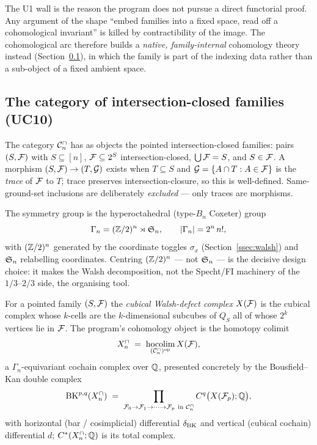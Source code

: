 \begin{remark}
\label{rem:u1-lesson}
The U1 wall is the reason the program does not pursue a direct
functorial proof. Any argument of the shape ``embed families into a
fixed space, read off a cohomological invariant'' is killed by
contractibility of the image. The cohomological arc therefore builds a
\emph{native, family-internal} cohomology theory instead
(Section~\ref{ssec:cn-category}), in which the family is part of the
indexing data rather than a sub-object of a fixed ambient space.
\end{remark}

\subsection{The category of intersection-closed families (UC10)}
\label{ssec:cn-category}

\begin{definition}
\label{def:cn-category}
The category $\mathcal{C}^{\cap}_n$ has as objects the pointed intersection-closed
families: pairs $(S,\mathcal{F})$ with $S\subseteq[n]$, $\mathcal{F}\subseteq2^S$
intersection-closed, $\bigcup\mathcal{F}=S$, and $S\in\mathcal{F}$. A morphism
$(S,\mathcal{F})\to(T,\mathcal{G})$ exists when $T\subseteq S$ and $\mathcal{G}=\{A\cap T:A\in\mathcal{F}\}$
is the \emph{trace} of $\mathcal{F}$ to $T$; trace preserves
intersection-closure, so this is well-defined. Same-ground-set
inclusions are deliberately \emph{excluded} --- only traces are
morphisms.
\end{definition}

The symmetry group is the hyperoctahedral (type-$B_n$ Coxeter) group
\[
  \Gamma_n=(\mathbb{Z}/2)^n\rtimes\mathfrak{S}_n,\qquad|\Gamma_n|=2^n\,n!,
\]
with $(\mathbb{Z}/2)^n$ generated by the coordinate toggles $\sigma_x$
(Section~\ref{ssec:walsh}) and $\mathfrak{S}_n$ relabelling coordinates.
Centring $(\mathbb{Z}/2)^n$ --- not $\mathfrak{S}_n$ --- is the decisive design choice:
it makes the Walsh decomposition, not the Specht/FI machinery of the
$1/3$--$2/3$ side, the organising tool.

\begin{definition}
\label{def:cubical-defect-complex}
For a pointed family $(S,\mathcal{F})$ the \emph{cubical Walsh-defect complex}
$X(\mathcal{F})$ is the cubical complex whose $k$-cells are the $k$-dimensional
subcubes of $Q_S$ all of whose $2^k$ vertices lie in $\mathcal{F}$. The program's
cohomology object is the homotopy colimit
\[
  X^{\cap}_n\;=\;\operatorname*{hocolim}_{(\mathcal{C}^{\cap}_n)^{\mathrm{op}}}X(\mathcal{F}),
\]
a $\Gamma_n$-equivariant cochain complex over $\mathbb{Q}$, presented
concretely by the Bousfield--Kan double complex~\cite{bousfield-kan}
\[
  \BK^{p,q}(\Xn)\;=\;\prod_{\F_0\to\F_1\to\cdots\to\F_p\ \text{in }\Cn}
  C^q\bigl(X(\F_p);\Q\bigr),
\]
with horizontal (bar / cosimplicial) differential $\delta_{\mathrm{BK}}$ and
vertical (cubical cochain) differential $d$; $C^*(X^{\cap}_n;\mathbb{Q})$ is its total
complex.
\end{definition}

